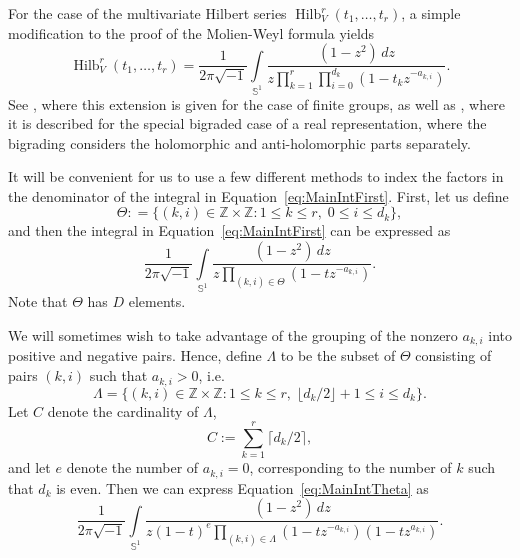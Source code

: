 \documentclass{amsart}
\theoremstyle{definition}
\theoremstyle{remark}
\newcommand{\Sp}{\mathbb{S}}
\newcommand{\Z}{\mathbb{Z}}
\newcommand{\Hilb}{\operatorname{Hilb}}
\begin{document}
For the case of the multivariate Hilbert series $\Hilb_V^r(t_1,\ldots,t_r)$, a simple modification to the proof
of the Molien-Weyl formula yields
\begin{equation}
\label{eq:MainIntMultivar}
    \Hilb_V^r(t_1,\ldots,t_r)
    =
    \frac{1}{2\pi\sqrt{-1} }\int\limits_{\Sp^1}
        \frac{ (1 - z^2) \, dz}
        {z \prod\limits_{k=1}^r \prod\limits_{i=0}^{d_k} (1 - t_k z^{-a_{k,i}}) }.
\end{equation}
See \cite[Equation (13)]{StanleyInvarFinGrp}, where this extension is given for the case of finite groups,
as well as \cite[Section IV]{Forger}, where it is described for the special bigraded case of a real
representation, where the bigrading considers the holomorphic and anti-holomorphic parts separately.


It will be convenient for us to use a few different methods to index the factors in the denominator
of the integral in Equation~\eqref{eq:MainIntFirst}. First, let us define
\[
    \Theta: = \{(k,i)\in \Z\times\Z : 1 \leq k \leq r, \; 0 \leq  i \leq d_k \},
\]
and then the integral in Equation~\eqref{eq:MainIntFirst} can be expressed as
\begin{equation}
\label{eq:MainIntTheta}
    \frac{1}{2\pi\sqrt{-1} }\int\limits_{\Sp^1}
        \frac{ (1 - z^2) \, dz}
        {z \prod\limits_{(k,i)\in\Theta} (1 - t z^{-a_{k,i}}) }.
\end{equation}
Note that $\Theta$ has $D$ elements.

We will sometimes wish to take advantage of the grouping of the nonzero $a_{k,i}$ into positive and
negative pairs. Hence, define $\Lambda$ to be the subset of $\Theta$ consisting of pairs $(k,i)$ such that
$a_{k,i} > 0$, i.e.
\[
    \Lambda = \{(k,i)\in \Z\times\Z : 1 \leq k \leq r, \; \lfloor d_k/2 \rfloor + 1 \leq  i \leq d_k \}.
\]
Let $C$ denote the cardinality of $\Lambda$,
\[
    C := \sum\limits_{k=1}^r \lceil d_k/2 \rceil,
\]
and let $e$ denote the number of $a_{k,i} = 0$, corresponding to the number of $k$ such that $d_k$ is even.
Then we can express Equation~\eqref{eq:MainIntTheta} as
\begin{equation}
\label{eq:MainIntLambda}
    \frac{1}{2\pi\sqrt{-1}}\int\limits_{\Sp^1}
        \frac{ (1 - z^2) \, dz}
        {z (1 - t)^e \prod\limits_{(k,i)\in\Lambda}
            (1 - t z^{-a_{k,i}})(1 - t z^{a_{k,i}})}.
\end{equation}


\end{document}
